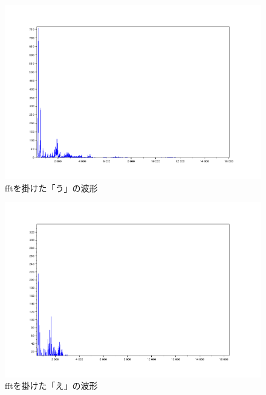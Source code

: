 \documentclass[12pt,oneside]{sotsuken_paper}
\begin{document}
\begin{figure}[htbp]
\begin{center}
\includegraphics[width=120mm]{img/u_fft.png}
\caption{fftを掛けた「う」の波形}
\label{fig:u_fft}
\end{center}
\end{figure}


\begin{figure}[htbp]
\begin{center}
\includegraphics[width=120mm]{img/e_fft.png}
\caption{fftを掛けた「え」の波形}
\label{fig:e_fft}
\end{center}
\end{figure}
\end{document}
